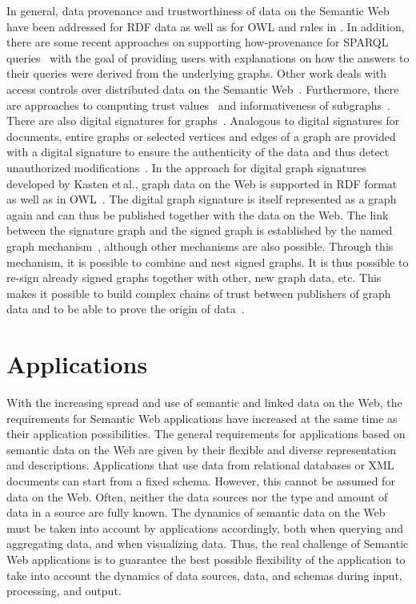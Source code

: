 \documentclass[a4paper,USenglish]{tgdk-v2021}
\begin{document}
In general, data provenance and trustworthiness of data on the Semantic Web have been addressed for RDF data \cite{DBLP:journals/ki/DividinoSSS09,DBLP:conf/semweb/FlourisFPTC09} as well as for OWL and rules in \cite{DBLP:journals/ki/DividinoSSS09}.
In addition, there are some recent approaches on supporting how-provenance for SPARQL queries~\cite{DBLP:journals/jacm/GeertsUKFC16,DBLP:journals/pvldb/HernandezGH21,DBLP:conf/www/Galarraga0KH23} with the goal of providing users with explanations on how the answers to their queries were derived from the underlying graphs.
Other work deals with access controls over distributed data on the Semantic Web~\cite{DBLP:conf/esws/GavriloaieNOSW04}.
Furthermore, there are approaches to computing trust values~\cite{DBLP:journals/jair/StoilosSPTH07} and informativeness of subgraphs~\cite{DBLP:conf/cikm/KasneciEW09}.
There are also digital signatures for graphs~\cite{DBLP:conf/ecai/BellomariniNS20}.
Analogous to digital signatures for documents, entire graphs or selected vertices and edges of a graph are provided with a digital signature to ensure the authenticity of the data and thus detect unauthorized modifications~\cite{DBLP:phd/dnb/Kasten16}.
In the approach for digital graph signatures developed by Kasten et\,al., graph data on the Web is supported in RDF format as well as in OWL~\cite{DBLP:conf/esws/KastenSS14}.
The digital graph signature is itself represented as a graph again and can thus be published together with the data on the Web.
The link between the signature graph and the signed graph is established by the named graph mechanism~\cite{DBLP:conf/esws/KastenSS14}, although other mechanisms are also possible.
Through this mechanism, it is possible to combine and nest signed graphs.
It is thus possible to re-sign already signed graphs together with other, new graph data, etc.
This makes it possible to build complex chains of trust between publishers of graph data and to be able to prove the origin of data~\cite{DBLP:conf/esws/KastenSS14,DBLP:phd/dnb/Kasten16}.

\section{Applications}
\label{sec:userinterfaces}
\label{sec:examples}

With the increasing spread and use of semantic and linked data on the Web, the requirements for Semantic Web applications have increased at the same time as their application possibilities.
The general requirements for applications based on semantic data on the Web are given by their flexible and diverse representation and descriptions.
Applications that use data from relational databases or XML documents can start from a fixed schema. 
However, this cannot be assumed for data on the Web. 
Often, neither the data sources nor the type and amount of data in a source are fully known.
The dynamics of semantic data on the Web must be taken into account by applications accordingly, both when querying and aggregating data, and when visualizing data.
Thus, the real challenge of Semantic Web applications is to guarantee the best possible flexibility of the application to take into account the dynamics of data sources, data, and schemas during input, processing, and output.
\end{document}
